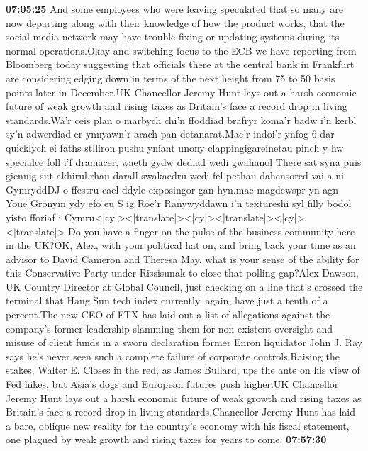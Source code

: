\documentclass{article}%
\begin{document}
\textbf{07:05:25}%
\newline%
And some employees who were leaving speculated that so many are now departing along with their knowledge of how the product works, that the social media network may have trouble fixing or updating systems during its normal operations.Okay and switching focus to the ECB we have reporting from Bloomberg today suggesting that officials there at the central bank in Frankfurt are considering edging down in terms of the next height from 75 to 50 basis points later in December.UK Chancellor Jeremy Hunt lays out a harsh economic future of weak growth and rising taxes as Britain's face a record drop in living standards.Wa'r ceis plan o marbych chi'n ffoddiad brafryr koma'r badw i'n kerbl sy'n adwerdiad er ynnyawn'r arach pan detanarat.Mae'r indoi'r ynfog 6 dar quicklych ei faths stlliron pushu yniant unony clappingigareinetau pinch y hw specialce foll i'f dramacer, waeth gydw dediad wedi gwahanol There sat syna puis giennig sut akhirul.rhau darall swakaedru wedi fel pethau dahensored vai a ni GymryddDJ o ffestru cael ddyle exposingor gan hyn.mae magdewspr yn agn Youe Gronym ydy efo eu S ig Roe'r Ranywyddawn i'n textureshi syl filly bodol yisto fforiaf i Cymru<|cy|><|translate|><|cy|><|translate|><|cy|><|translate|> Do you have a finger on the pulse of the business community here in the UK?OK, Alex, with your political hat on, and bring back your time as an advisor to David Cameron and Theresa May, what is your sense of the ability for this Conservative Party under Rissisunak to close that polling gap?Alex Dawson, UK Country Director at Global Council, just checking on a line that's crossed the terminal that Hang Sun tech index currently, again, have just a tenth of a percent.The new CEO of FTX has laid out a list of allegations against the company's former leadership slamming them for non{-}existent oversight and misuse of client funds in a sworn declaration former Enron liquidator John J. Ray says he's never seen such a complete failure of corporate controls.Raising the stakes, Walter E. Closes in the red, as James Bullard, ups the ante on his view of Fed hikes, but Asia's dogs and European futures push higher.UK Chancellor Jeremy Hunt lays out a harsh economic future of weak growth and rising taxes as Britain's face a record drop in living standards.Chancellor Jeremy Hunt has laid a bare, oblique new reality for the country's economy with his fiscal statement, one plagued by weak growth and rising taxes for years to come.%
\textbf{07:57:30}%
\newline%
\end{document}
